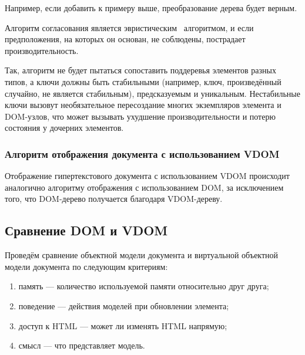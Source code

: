 Например, если добавить  к примеру выше, преобразование дерева будет верным.
\newline


Алгоритм согласования является эвристическим~\cite{euristic} алгоритмом, и если предположения, на которых он основан, не соблюдены, пострадает производительность.

Так, алгоритм не будет пытаться сопоставить поддеревья элементов разных типов, а ключи должны быть стабильными (например, ключ, произведённый случайно, не является стабильным), предсказуемым и уникальным.
Нестабильные ключи вызовут необязательное пересоздание многих экземпляров элемента и DOM-узлов, что может вызывать ухудшение производительности и потерю состояния у дочерних элементов.
\clearpage

\subsubsection{Алгоритм отображения документа с использованием VDOM}

Отображение гипертекстового документа с использованием VDOM происходит аналогично алгоритму отображения с использованием DOM, за исключением того, что DOM-дерево получается благодаря VDOM-дереву.

\subsection{Сравнение DOM и VDOM}

Проведём сравнение объектной модели документа и виртуальной объектной модели документа по следующим критериям:
\begin{enumerate}[label=\arabic*)]
	\item память --- количество используемой памяти относительно друг друга;
	\item поведение --- действия моделей при обновлении элемента;
	\item доступ к HTML --- может ли изменять HTML напрямую;
	\item смысл --- что представляет модель.
\end{enumerate}


